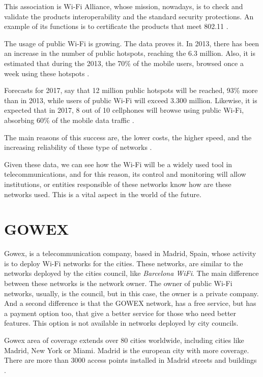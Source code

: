 \documentclass[12pt, a4paper,twoside]{tesi_upf}
\begin{document}
This association is Wi-Fi Alliance, whose mission, nowadays, is to check and validate the products interoperability and the standard security protections. An example of its functions is to certificate the products that meet 802.11 \cite{wifialliance}.

The usage of public Wi-Fi is growing. The data proves it. In 2013, there has been an increase in the number of public hotspots, reaching the 6.3 million. Also, it is estimated that during the 2013, the 70\% of the mobile users, browsed once a week using these hotspots \cite{informe2013}.

Forecasts for 2017, say that 12 million public hotspots will be reached, 93\% more than in 2013, while users of public Wi-Fi will exceed 3.300 million. Likewise, it is expected that in 2017, 8 out of 10 cellphones will browse using public Wi-Fi, absorbing 60\% of the mobile data traffic \cite{informe2013}. 

The main reasons of this success are, the lower costs, the higher speed, and the increasing reliability of these type of networks \cite{informe2013}.

Given these data, we can see how the Wi-Fi will be a widely used tool in telecommunications, and for this reason, its control and monitoring will allow institutions, or entities responsible of these networks know how are these networks used. This is a vital aspect in the world of the future.

\section{GOWEX}
Gowex, is a telecommunication company, based in Madrid, Spain, whose activity is to deploy Wi-Fi networks for the cities. These networks, are similar to the networks deployed by the cities council, like \emph{Barcelona WiFi}. The main difference between these networks is the network owner. The owner of public Wi-Fi networks, usually, is the council, but in this case, the owner is a private company. And a second difference is that the GOWEX network, has a free service, but has a payment option too, that give a better service for those who need better features. This option is not available in networks deployed by city councils.

Gowex area of coverage extends over 80 cities worldwide, including cities like Madrid, New York or Miami. Madrid is the european city with more coverage. There are more than 3000 access points installed in Madrid streets and buildings \cite{gowex1}.
\end{document}
